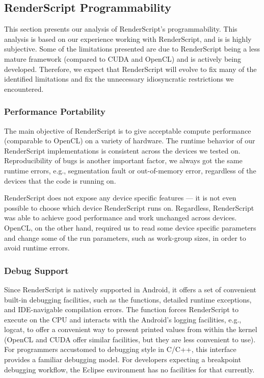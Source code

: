 \subsection{RenderScript Programmability}

This section presents our analysis of RenderScript's programmability.
This analysis is based on our experience working with RenderScript, and is 
  is highly subjective.
Some of the limitations presented are due to RenderScript being a less mature
  framework (compared to CUDA and OpenCL) and is actively being developed.
Therefore, we expect that RenderScript will evolve to fix many of the
identified limitations and fix the unnecessary idiosyncratic restrictions we encountered.

\subsubsection{Performance Portability}

The main objective of RenderScript is to give acceptable compute performance
 (comparable to OpenCL) on a variety of hardware.
The runtime behavior of our RenderScript implementations is consistent across
the devices we tested on.
Reproducibility of bugs is another important factor, we
always got the same runtime errors, e.g., segmentation fault or out-of-memory
error, regardless of the devices that the code is running on.

RenderScript does not expose any device specific features --- it is not even 
 possible to choose which device RenderScript runs on.
Regardless, RenderScript was able to achieve good performance and work unchanged 
 across devices.
OpenCL, on the other hand, required us to read some device specific parameters
 and change some of the run parameters, such as work-group sizes, in order to avoid 
 runtime errors.

\subsubsection{Debug Support}

Since RenderScript is natively supported in Android, it offers a set of
convenient built-in debugging facilities, such as the  functions,
detailed runtime exceptions, and IDE-navigable compilation errors.  The
 function forces RenderScript to execute on the CPU and interacts
with the Android's logging facilities, e.g., logcat, to offer a convenient way
to present printed values from within the kernel (OpenCL and CUDA offer similar
facilities, but they are less convenient to use).  For programmers accustomed to
 debugging style in C/C++, this interface provides a familiar
debugging model. For developers expecting a breakpoint debugging workflow, the
Eclipse environment has no facilities for that currently.


